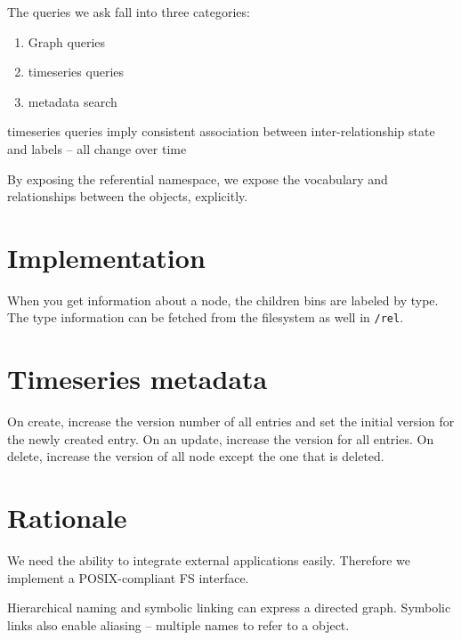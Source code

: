 The queries we ask fall into three categories:
\begin{enumerate}
\item Graph queries
\item timeseries queries
\item metadata search
\end{enumerate}

timeseries queries imply consistent association between inter-relationship state and labels -- all change over time

By exposing the referential namespace, we expose the vocabulary and relationships between the objects, explicitly.	

\section{Implementation}

When you get information about a node, the children bins are labeled by type.  The type information can
be fetched from the filesystem as well in {\tt /rel}.

\section{Timeseries metadata}
On create, increase the version number of all entries and set the initial version for the newly created entry.
On an update, increase the version for all entries.  On delete, increase the version of all node except the one that
is deleted.


\section{Rationale}
We need the ability to integrate external applications easily.  Therefore we implement a POSIX-compliant FS interface.

Hierarchical naming and symbolic linking can express a directed graph.  Symbolic links also enable 
aliasing -- multiple names to refer to a object.

